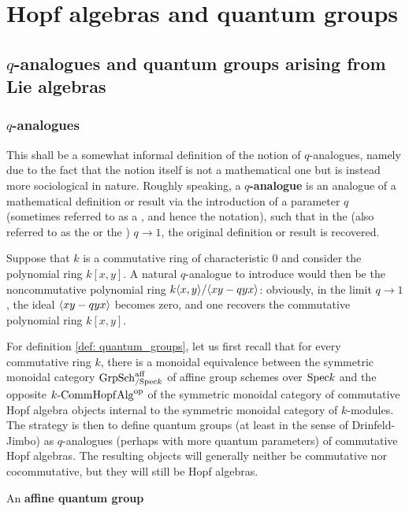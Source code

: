 \section{Hopf algebras and quantum groups}
    \subsection{\texorpdfstring{$q$}{}-analogues and quantum groups arising from Lie algebras}
        \subsubsection{\texorpdfstring{$q$}{}-analogues}
            \begin{definition}[$q$-analogues] \label{def: q_analogues}
                This shall be a somewhat informal definition of the notion of $q$-analogues, namely due to the fact that the notion itself is not a mathematical one but is instead more sociological in nature. Roughly speaking, a \textbf{$q$-analogue} is an analogue of a mathematical definition or result via the introduction of a parameter $q$ (sometimes referred to as a , and hence the notation), such that in the  (also referred to as the  or the ) $q \to 1$, the original definition or result is recovered. 
            \end{definition}
            \begin{example}
                Suppose that $k$ is a commutative ring of characteristic $0$ and consider the polynomial ring $k[x, y]$. A natural $q$-analogue to introduce would then be the noncommutative polynomial ring $k\langle x, y\rangle/\langle xy - q yx\rangle$: obviously, in the limit $q \to 1$, the ideal $\langle xy - q yx\rangle$ becomes zero, and one recovers the commutative polynomial ring $k[x, y]$.
            \end{example}
            
            \begin{remark}
                For definition \ref{def: quantum_groups}, let us first recall that for every commutative ring $k$, there is a monoidal equivalence between the symmetric monoidal category $\mathrm{Grp}\mathrm{Sch}_{/\mathrm{Spec} k}^{\mathrm{aff}}$ of affine group schemes over $\mathrm{Spec} k$ and the opposite $k\text{-}\mathrm{Comm}\mathrm{Hopf}\mathrm{Alg}^{\mathrm{op}}$ of the symmetric monoidal category of commutative Hopf algebra objects internal to the symmetric monoidal category of $k$-modules. The strategy is then to define quantum groups (at least in the sense of Drinfeld-Jimbo) as $q$-analogues (perhaps with more quantum parameters) of commutative Hopf algebras. The resulting objects will generally neither be commutative nor cocommutative, but they will still be Hopf algebras. 
            \end{remark}
            \begin{definition} \label{def: quantum_groups}
                An \textbf{affine quantum group}
            \end{definition}
            
